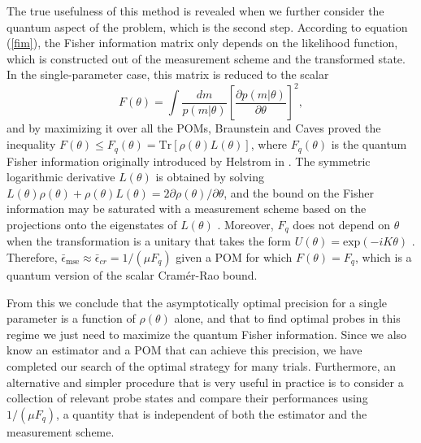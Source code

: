 The true usefulness of this method is revealed when we further consider the quantum aspect of the problem, which is the second step. According to equation (\ref{fim}), the Fisher information matrix only depends on the likelihood function, which is constructed out of the measurement scheme and the transformed state. In the single-parameter case, this matrix is reduced to the scalar
\begin{equation}
F(\theta) = \int \frac{dm}{p(m|\theta)}\left[\frac{\partial p(m|\theta)}{\partial \theta}\right]^2,
\label{fishersingleparameter}
\end{equation} 
and by maximizing it over all the POMs, Braunstein and Caves \cite{BraunsteinCaves1994} proved the inequality $F(\theta) \leqslant F_q(\theta) = \mathrm{Tr}\left[ \rho(\theta) L(\theta) \right]$, where $F_q(\theta)$ is the quantum Fisher information originally introduced by Helstrom in \cite{helstrom1967mmse}. The symmetric logarithmic derivative $L(\theta)$ is obtained by solving $L(\theta)\rho(\theta) + \rho(\theta)L(\theta) = 2 \partial \rho(\theta)/\partial \theta$, and the bound on the Fisher information may be saturated with a measurement scheme based on the projections onto the eigenstates of $L(\theta)$ \cite{BraunsteinCaves1994, genoni2008}. Moreover, $F_q$ does not depend on $\theta$ when the transformation is a unitary that takes the form $U(\theta)=\mathrm{exp}(-i K \theta)$ \cite{pezze2014, rafal2015}. Therefore, $\bar{\epsilon}_{\mathrm{mse}} \approx \bar{\epsilon}_{cr} = 1/\left(\mu F_q\right)$ given a POM for which $F(\theta) = F_q$, which is a quantum version of the scalar Cram\'{e}r-Rao bound.  

From this we conclude that the asymptotically optimal precision for a single parameter is a function of $\rho(\theta)$ alone, and that to find optimal probes in this regime we just need to maximize the quantum Fisher information. Since we also know an estimator and a POM that can achieve this precision, we have completed our search of the optimal strategy for many trials. Furthermore, an alternative and simpler procedure that is very useful in practice is to consider a collection of relevant probe states and compare their performances using $1/\left(\mu F_q\right)$, a quantity that is independent of both the estimator and the measurement scheme.

